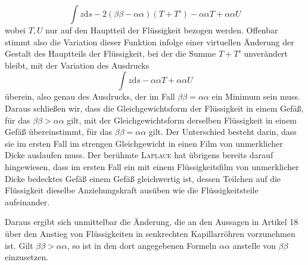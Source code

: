 \[
\int z\mathrm{d}s-2(\beta\beta-\alpha\alpha)(T+T')-\alpha\alpha T+\alpha\alpha U
\]
wobei $T,U$ nur auf den Hauptteil der Flüssigkeit bezogen werden. Offenbar stimmt also die Variation dieser Funktion infolge einer virtuellen Änderung der Gestalt des Hauptteils der Flüssigkeit, bei der die Summe $T+T'$ unverändert bleibt, mit der Variation des Ausdrucks
%
\[
\int z\mathrm{d}s-\alpha\alpha T+\alpha\alpha U
\]
überein, also genau des Ausdrucks, der im Fall $\beta\beta=\alpha\alpha$ ein Minimum sein muss. Daraus schließen wir, dass die Gleichgewichtsform der Flüssigkeit in einem Gefäß, für das $\beta\beta>\alpha\alpha$ gilt, mit der Gleichgewichtsform derselben Flüssigkeit in einem Gefäß übereinstimmt, für das $\beta\beta=\alpha\alpha$ gilt. Der Unterschied besteht darin, dass sie im ersten Fall im strengen Gleichgewicht in einen Film von unmerklicher Dicke auslaufen muss. Der berühmte \textsc{Laplace} hat übrigens bereits darauf hingewiesen, dass im ersten Fall ein mit einem Flüssigkeitsfilm von unmerklicher Dicke bedecktes Gefäß einem Gefäß gleichwertig ist, dessen Teilchen auf die Flüssigkeit dieselbe Anziehungskraft ausüben wie die Flüssigkeitsteile aufeinander.

Daraus ergibt sich unmittelbar die Änderung, die an den Aussagen in Artikel 18 über den Anstieg von Flüssigkeiten in senkrechten Kapillarröhren vorzunehmen ist. Gilt $\beta\beta>\alpha\alpha$, so ist in den dort angegebenen Formeln $\alpha\alpha$ anstelle von $\beta\beta$ einzusetzen.

